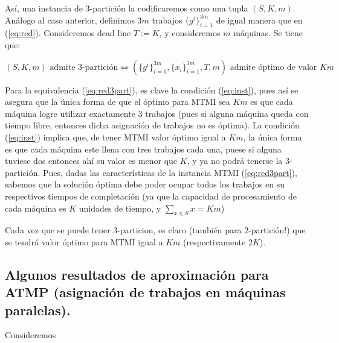 \documentclass[10pt]{article}
\theoremstyle{plain}
\theoremstyle{definition}
\begin{document}
Así, una instancia de $3$-partición la codificaremos como una tupla $(S, K, m)$. Análogo al caso anterior, definimos $3m$ trabajos $\{g^i\}_{i=1}^{3m}$ de igual manera que en (\ref{eq:red}). Consideremos dead line $T:=K$, y consideremos $m$ máquinas. Se tiene que:

\begin{equation}
\label{eq:red3part}
(S, K, m) \text{ admite $3$-partición} \Longleftrightarrow (\{g^i\}_{i=1}^{3m}, \{x_i\}_{i=1}^{3m}, T, m)
\text{ admite óptimo de valor $Km$}
\end{equation}

Para la equivalencia (\ref{eq:red3part}), es clave la condición  (\ref{eq:inst}), pues así se asegura que la única forma de que el óptimo para MTMI sea $Km$ es que cada máquina logre utilizar exactamente 3 trabajos (pues si alguna máquina queda con tiempo libre, entonces dicha asignación de trabajos no es óptima). La condición (\ref{eq:inst}) implica que, de tener MTMI valor óptimo igual a $Km$, la única forma es que cada máquina este llena con tres trabajos cada una, puese si alguna tuviese dos entonces ahí su valor es menor que $K$, y ya no podrá tenerse la 3-partición. Pues, dadas las características de la instancia MTMI (\ref{eq:red3part}), sabemos que la solución óptima debe poder ocupar todos los trabajos en su respectivos tiempos de completación (ya que la capacidad de procesamiento de cada máquina es $K$ unidades de tiempo, y $\sum_{x \in S} x = Km$)

Cada vez que se puede tener 3-particion, es claro (también para $2$-partición!) que se tendrá valor óptimo para MTMI igual a $Km$ (respectivamente $2K$).

\subsection{Algunos resultados de aproximación para ATMP (asignación de trabajos en máquinas paralelas).}

Consideremos 
\end{document}
